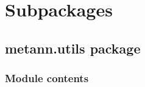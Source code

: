 \documentclass[letterpaper,10pt,english]{sphinxmanual}
\begin{document}
\section{Subpackages}
\label{\detokenize{metann:subpackages}}

\subsection{metann.utils package}
\label{\detokenize{metann.utils:metann-utils-package}}\label{\detokenize{metann.utils::doc}}

\subsubsection{Module contents}
\label{\detokenize{metann.utils:module-metann.utils}}\label{\detokenize{metann.utils:module-contents}}
\end{document}
